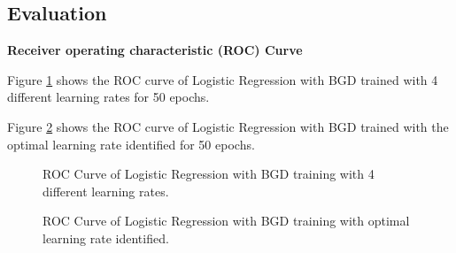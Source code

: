 \documentclass{article} %
\begin{document}
\subsection{Evaluation}

\textbf{Receiver operating characteristic (ROC) Curve}

Figure \ref{Fig11} shows the ROC curve of Logistic Regression with BGD trained with 4 different learning rates for 50 epochs.

Figure \ref{Fig12} shows the ROC curve of Logistic Regression with BGD trained with the optimal learning rate identified for 50 epochs.\newline \newline

\begin{figure}[!htbp]
\begin{center}
\end{center}
\caption{ROC Curve of Logistic Regression with BGD training with 4 different learning rates.}
\label{Fig11}
\end{figure}

\begin{figure}[!htbp]
\begin{center}
\end{center}
\caption{ROC Curve of Logistic Regression with BGD training with optimal learning rate identified.}
\label{Fig12}
\end{figure}
\end{document}
